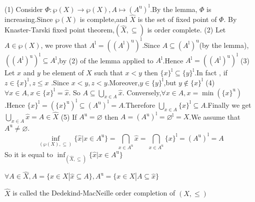 \documentclass{book}
\numberwithin{equation}{section}
\begin{document}
\begin{proofenv}
    \quad
    \newline
    (1) Consider $\Phi :\wp(X)\rightarrow\wp(X),A\mapsto(A^\mathrm{u})^\mathrm{l}$.By the lemma, $\Phi $  is increasing.Since $\wp(X)$ is complete,and $\hat{X}$ is the set of fixed point of $\Phi$. By Knaster-Tarski fixed point theorem,$(\hat{X},\subseteq)$ is order complete.
    \newline
    (2) Let $A\in \wp(X)$, we prove that $A^\mathrm{l}=((A^\mathrm{l})^\mathrm{u})^\mathrm{l}$.Since $A\subseteq (A^\mathrm{l})^\mathrm{u}$(by the lemma),$((A^\mathrm{l})^\mathrm{u})^\mathrm{l}\subseteq A^\mathrm{l}$,by (2) of the lemma applied to $A^\mathrm{l}$.Hence $A^\mathrm{l}=((A^\mathrm{l})^\mathrm{u})^\mathrm{l}$
    \newline
    (3) Let $x$ and $y$ be element of $X$ such that $x< y$ then $\{x\}^\mathrm{l}\subseteq\{y\}^\mathrm{l}$.In fact , if $z\in \{x\}^\mathrm{l},z\le x$ .Since $x<y,z<y$.Moreover,$y\in \{y\}^\mathrm{l}$,but $y\notin \{x\}^\mathrm{l}$ 
    \newline
    (4) $\forall x \in A,x\in \{x\}^\mathrm{l}=\hat{x}$. So $A\subseteq\bigcup_{x\in A}\hat{x}$.
    Conversely,$\forall x\in A, x=\min (\{x\}^\mathrm{u})$.Hence $\{x\}^\mathrm{l}=(\{x\}^\mathrm{u})^\mathrm{l}\subseteq (A^\mathrm{u})^\mathrm{l}=A$.Therefore $\bigcup_{x\in A}\{x\}^\mathrm{l}\subseteq A$.Finally we get $\bigcup_{x\in A}\hat{x}=A\in \hat{X}$
    \newline
    (5) If $A^\mathrm{u}=\varnothing$ then $A=(A^\mathrm{u})^\mathrm{l}=\varnothing^\mathrm{l}=X$.We assume that $A^\mathrm{u}\not=\varnothing$.
    $$\inf _{(\wp(X),\subseteq)}\{\hat{x}|x\in A^\mathrm{u}\}=\bigcap_{x\in A^\mathrm{u}}\hat{x}=\bigcap_{x\in A^\mathrm{u}}\{x\}^\mathrm{l}=(A^\mathrm{u})^\mathrm{l}=A$$
    So it is equal to $\inf_{(\hat{X},\subseteq)}\{\hat{x}|x\in A ^\mathrm{u}\}$
\end{proofenv}
\begin{remark}
    $\forall A\in \hat{X},A=\{x\in X|\hat{x}\subseteq A\},A^\mathrm{u}=\{x\in X|A\subseteq \hat{x}\}$
\end{remark}
\begin{definitionenv}
    $\hat{X}$ is called the Dedekind-MacNeille order completion of $(X,\le)$
\end{definitionenv}
\end{document}

